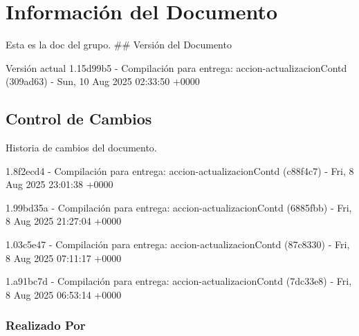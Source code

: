 \documentclass[
	a4paper, %
	12pt, %
]{include/CSSullivanBusinessReport}
\begin{document}
\newpage

\begin{twothirdswidth} %
	\tableofcontents %
\end{twothirdswidth}

\newpage


\newpage

\section{Información del
Documento}\label{sec:informaciuxf3n-del-documento}

Esta es la doc del grupo. \#\# Versión del Documento

\begin{quote}
\end{quote}

Versión actual 1.15d99b5 - Compilación para entrega:
accion-actualizacionContd (309ad63) - Sun, 10 Aug 2025 02:33:50 +0000

\subsection{Control de Cambios}\label{sec:control-de-cambios}

Historia de cambios del documento.

1.8f2ecd4 - Compilación para entrega: accion-actualizacionContd
(c88f4c7) - Fri, 8 Aug 2025 23:01:38 +0000

1.99bd35a - Compilación para entrega: accion-actualizacionContd
(6885fbb) - Fri, 8 Aug 2025 21:27:04 +0000

1.03c5e47 - Compilación para entrega: accion-actualizacionContd
(87c8330) - Fri, 8 Aug 2025 07:11:17 +0000

1.a91bc7d - Compilación para entrega: accion-actualizacionContd
(7dc33e8) - Fri, 8 Aug 2025 06:53:14 +0000

\subsubsection{Realizado Por}\label{sec:realizado-por}
\end{document}
